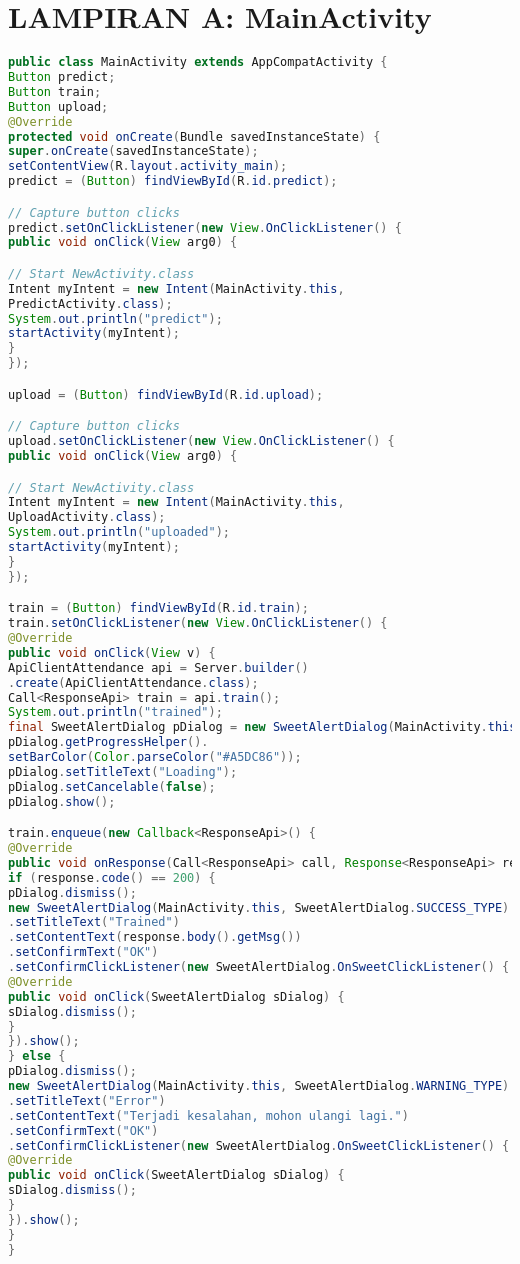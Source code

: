 \chapter{LAMPIRAN A: MainActivity}
\begin{lstlisting}[language=Java, caption=Implementasi Kelas Main, label=code:main, firstnumber=23]
public class MainActivity extends AppCompatActivity {
Button predict;
Button train;
Button upload;
@Override
protected void onCreate(Bundle savedInstanceState) {
super.onCreate(savedInstanceState);
setContentView(R.layout.activity_main);
predict = (Button) findViewById(R.id.predict);

// Capture button clicks
predict.setOnClickListener(new View.OnClickListener() {
public void onClick(View arg0) {

// Start NewActivity.class
Intent myIntent = new Intent(MainActivity.this,
PredictActivity.class);
System.out.println("predict");
startActivity(myIntent);
}
});

upload = (Button) findViewById(R.id.upload);

// Capture button clicks
upload.setOnClickListener(new View.OnClickListener() {
public void onClick(View arg0) {

// Start NewActivity.class
Intent myIntent = new Intent(MainActivity.this,
UploadActivity.class);
System.out.println("uploaded");
startActivity(myIntent);
}
});

train = (Button) findViewById(R.id.train);
train.setOnClickListener(new View.OnClickListener() {
@Override
public void onClick(View v) {
ApiClientAttendance api = Server.builder()
.create(ApiClientAttendance.class);
Call<ResponseApi> train = api.train();
System.out.println("trained");
final SweetAlertDialog pDialog = new SweetAlertDialog(MainActivity.this, SweetAlertDialog.PROGRESS_TYPE);
pDialog.getProgressHelper().
setBarColor(Color.parseColor("#A5DC86"));
pDialog.setTitleText("Loading");
pDialog.setCancelable(false);
pDialog.show();

train.enqueue(new Callback<ResponseApi>() {
@Override
public void onResponse(Call<ResponseApi> call, Response<ResponseApi> response) {
if (response.code() == 200) {
pDialog.dismiss();
new SweetAlertDialog(MainActivity.this, SweetAlertDialog.SUCCESS_TYPE)
.setTitleText("Trained")
.setContentText(response.body().getMsg())
.setConfirmText("OK")
.setConfirmClickListener(new SweetAlertDialog.OnSweetClickListener() {
@Override
public void onClick(SweetAlertDialog sDialog) {
sDialog.dismiss();
}
}).show();
} else {
pDialog.dismiss();
new SweetAlertDialog(MainActivity.this, SweetAlertDialog.WARNING_TYPE)
.setTitleText("Error")
.setContentText("Terjadi kesalahan, mohon ulangi lagi.")
.setConfirmText("OK")
.setConfirmClickListener(new SweetAlertDialog.OnSweetClickListener() {
@Override
public void onClick(SweetAlertDialog sDialog) {
sDialog.dismiss();
}
}).show();
}
}


\end{lstlisting}
